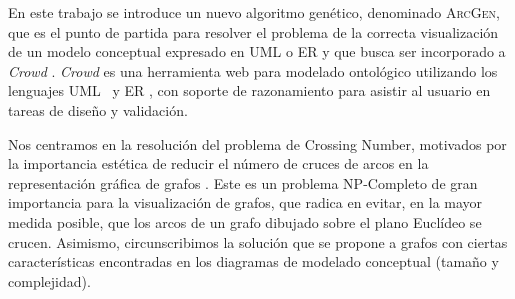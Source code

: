 	
	
	
	
	En este trabajo se introduce un nuevo algoritmo  genético,  denominado \textsc{ArcGen},  que es el  punto de partida  para  resolver el problema de la correcta visualización de un modelo conceptual expresado en UML o  ER  y que busca ser incorporado a {\it Crowd} \cite{gimenez2016crowd}. {\it Crowd} es una herramienta web para modelado ontológico utilizando los lenguajes  UML \cite{booch2005unified}\ y  ER \cite{chen1988entity}, con soporte de razonamiento para asistir al usuario en tareas de diseño y validación. 
	
	Nos centramos en la resolución del problema de Crossing Number, motivados por la  importancia  estética de reducir el número de cruces de arcos en la representación gráfica de grafos \cite{Kob14}. Este es un problema NP-Completo \cite{garey1983crossing} de gran importancia para la visualización de grafos, que radica en evitar, en la mayor medida posible, que los arcos de un grafo dibujado sobre el plano Euclídeo se crucen.
	Asimismo, circunscribimos la solución que se propone  a grafos con ciertas características encontradas en los diagramas de modelado conceptual (tamaño y complejidad).
	
	
